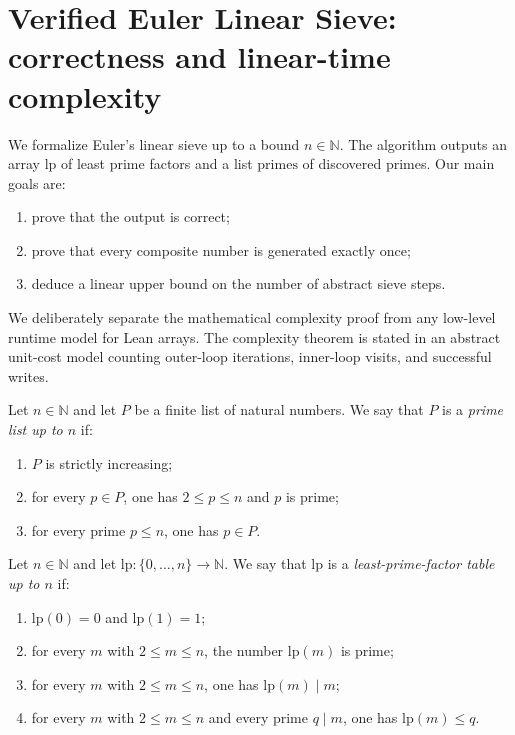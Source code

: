 \section{Verified Euler Linear Sieve: correctness and linear-time complexity}

We formalize Euler's linear sieve up to a bound $n \in \mathbb{N}$.
The algorithm outputs an array $\mathrm{lp}$ of least prime factors and a list $\mathrm{primes}$ of discovered primes.
Our main goals are:

\begin{enumerate}
    \item prove that the output is correct;
    \item prove that every composite number is generated exactly once;
    \item deduce a linear upper bound on the number of abstract sieve steps.
\end{enumerate}

We deliberately separate the mathematical complexity proof from any low-level runtime model for Lean arrays.
The complexity theorem is stated in an abstract unit-cost model counting outer-loop iterations, inner-loop visits, and successful writes.

\begin{definition}
    \label{def:prime_list_up_to}
    Let $n \in \mathbb{N}$ and let $P$ be a finite list of natural numbers.
    We say that $P$ is a \emph{prime list up to $n$} if:
    \begin{enumerate}
        \item $P$ is strictly increasing;
        \item for every $p \in P$, one has $2 \le p \le n$ and $p$ is prime;
        \item for every prime $p \le n$, one has $p \in P$.
    \end{enumerate}
\end{definition}

\begin{definition}
    \label{def:lpf_table}
    Let $n \in \mathbb{N}$ and let $\mathrm{lp} : \{0,\dots,n\} \to \mathbb{N}$.
    We say that $\mathrm{lp}$ is a \emph{least-prime-factor table up to $n$} if:
    \begin{enumerate}
        \item $\mathrm{lp}(0)=0$ and $\mathrm{lp}(1)=1$;
        \item for every $m$ with $2 \le m \le n$, the number $\mathrm{lp}(m)$ is prime;
        \item for every $m$ with $2 \le m \le n$, one has $\mathrm{lp}(m)\mid m$;
        \item for every $m$ with $2 \le m \le n$ and every prime $q\mid m$, one has $\mathrm{lp}(m)\le q$.
    \end{enumerate}
\end{definition}

